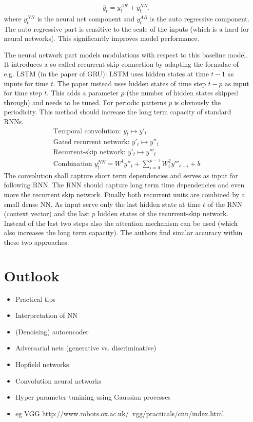 \documentclass[12pt,a4paper]{article}
\begin{document}
\begin{align}
	\hat y_t = y_t^{AR} + y_t^{NN},
\end{align}
where $y_t^{NN}$ is the  neural net component and $y_t^{AR}$ is the auto regressive component. The auto regressive part is sensitive to the scale of the inputs (which is a hard for neural networks). This significantly improves model performance. 

The neural network part models modulations with respect to this baseline model. It introduces a so called recurrent skip connection by adapting the formulae of e.g. LSTM (in the paper of GRU): LSTM  uses hidden states at time $t-1$ as inputs for time $t$. The paper instead uses hidden states of time step $t-p$ as input for time step $t$. This adds a parameter $p$ (the number of hidden states skipped through) and needs to be tuned. For periodic patterns $p$ is obviously the periodicity. This method should increase the long term capacity of standard RNNs.
\begin{align}
 	\text{Temporal convolution: } y_t \mapsto y'_t \\
 	\text{Gated recurrent network: } y'_t \mapsto y''_t \\ 
	\text{Recurrent-skip network: } y'_t \mapsto y'''_t \\ 	
	\text{Combination } y_t^{NN} = W^1y''_t +  \sum_{i=0}^{p-1}W^2_iy'''_{t-i} + b   
\end{align}
The convolution shall capture short term dependencies and serves as input for following RNN. The RNN should capture long term time dependencies and even more the recurrent skip network.  Finally both recurrent units are combined by a small dense NN. As input serve only the last hidden state at time $t$ of the RNN (context vector) and the last $p$ hidden states of the recurrent-skip network. Instead of the last two steps also the attention mechanism can be used (which also increases the long term capacity). The authors find similar accuracy within these two approaches.


\section{Outlook}
\begin{itemize}\setlength\itemsep{0em}
\item Practical tips \cite{2012arXiv1206.5533B, Hinton2012Practical, DBLP:series/lncs/7700} 
\item Interpretation of NN \cite{2017arXiv170607979M, KinSchAlbMueErhKimDae18}
\item (Denoising) autoencoder 
\item Adversarial nets (generative vs. discriminative)
\item Hopfield networks \cite{ramsauer2020hopfield}
\item Convolution neural networks 
\item Hyper parameter tunining using Gaussian processes
\item eg VGG http://www.robots.ox.ac.uk/~vgg/practicals/cnn/index.html
\end{itemize}
\end{document}
